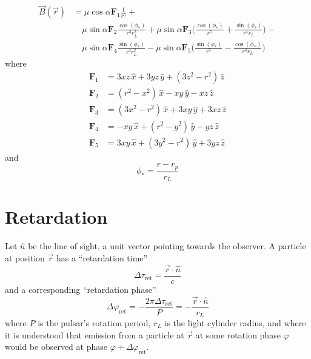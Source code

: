 \documentclass{article}
\newcommand{\phase}{\varphi}
\newcommand{\F}[1]{\bm{F}_{#1}}
\newcommand{\ph}{\phi_\ast}
\begin{document}
\begin{equation}
\begin{aligned}
    \vec{B}(\vec{r}) &= \mu \cos{\alpha} \F{1} \frac{1}{r^5} + \\
                   &\hspace{13pt} \mu \sin{\alpha} \F{2} \frac{\cos(\ph)}{r^3 r_L^2} +
                                  \mu \sin{\alpha} \F{3} \bigg(\frac{\cos(\ph)}{r^5} + \frac{\sin(\ph)}{r^4 r_L}\bigg) - \\
                   &\hspace{13pt} \mu \sin{\alpha} \F{4} \frac{\sin(\ph)}{r^3 r_L^2} -
                                  \mu \sin{\alpha} \F{5} \bigg(\frac{\sin(\ph)}{r^5} - \frac{\cos(\ph)}{r^4 r_L}\bigg)
\end{aligned}
\end{equation}
where
\begin{equation}
\begin{aligned}
    \F{1} &= 3xz\,\hat{x} + 3yz\,\hat{y} + (3z^2-r^2)\,\hat{z} \\
    \F{2} &= (r^2-x^2)\,\hat{x} - xy\,\hat{y} - xz\,\hat{z} \\
    \F{3} &= (3x^2-r^2)\,\hat{x} + 3xy\,\hat{y} + 3xz\,\hat{z} \\
    \F{4} &= -xy\,\hat{x} + (r^2-y^2)\,\hat{y} - yz\,\hat{z} \\
    \F{5} &= 3xy\,\hat{x} + (3y^2-r^2)\,\hat{y} + 3yz\,\hat{z}
\end{aligned}
\end{equation}
and
\begin{equation}
    \ph = \frac{r - r_p}{r_L}
\end{equation}

\section{Retardation}

Let $\hat{n}$ be the line of sight, a unit vector pointing towards the observer.
A particle at position $\vec{r}$ has a ``retardation time''
\begin{equation}
    \Delta\tau_\text{ret} = \frac{\vec{r}\cdot\hat{n}}{c}
\end{equation}
and a corresponding ``retardation phase''
\begin{equation}
    \Delta\phase_\text{ret} = -\frac{2\pi\Delta\tau_\text{ret}}{P} = -\frac{\vec{r}\cdot\hat{n}}{r_L}
\end{equation}
where $P$ is the pulsar's rotation period, $r_L$ is the light cylinder radius, and where it is understood that emission from a particle at $\vec{r}$ at some rotation phase $\phase$ would be observed at phase $\phase + \Delta\phase_\text{ret}$.
\end{document}
